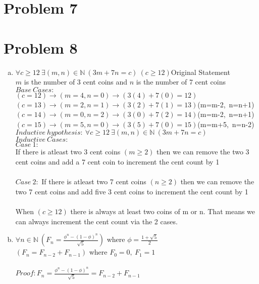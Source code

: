 \documentclass[11pt,letterpaper]{article}
\begin{document}
\section*{Problem 7}

\section*{Problem 8}
\begin{enumerate}[(a)]
\item

$\forall c\geq 12~\exists(m,n)\in\mathbb{N}~(3m + 7n = c)~(c\geq 12)$\hfill Original Statement\\
$m$ is the number of 3 cent coins and $n$ is the number of 7 cent coins\\
$Base~Cases:$\\
$(c=12)\rightarrow (m=4,n=0)\rightarrow (3(4) + 7(0) = 12)$\\
$(c=13)\rightarrow (m=2,n=1)\rightarrow (3(2) + 7(1) = 13)$\hfill (m=m-2,~n=n+1)\\
$(c=14)\rightarrow (m=0,n=2)\rightarrow (3(0) + 7(2) = 14)$\hfill (m=m-2,~n=n+1)\\
$(c=15)\rightarrow (m=5,n=0)\rightarrow (3(5) + 7(0) = 15)$\hfill (m=m+5,~n=n-2)\\
$Inductive~hypothesis:~\forall c\geq 12~\exists(m,n)\in\mathbb{N}~(3m + 7n = c)$\\
$Inductive~Cases:$\\
$Case~1:$\\
If there is atleast two 3 cent coins $(m\geq2)$ then we can remove the two 3 cent coins and add a 7 cent coin to increment the cent count by 1\\ 
\\
$Case~2:$
If there is atleast two 7 cent coins $(n\geq2)$ then we can remove the two 7 cent coins and add five 3 cent coins to increment the cent count by 1\\ 
\\
When $(c\geq 12)$ there is always at least two coins of m or n. That means we can always increment the cent count via the 2 cases.
\\
\item
$\forall n\in\mathbb{N}~(F_n = \frac{\phi^n-(1-\phi)^n}{\sqrt{5}})$ where $\phi = \frac{1+\sqrt{5}}{2}$\\
$(F_n = F_{n-2} +F_{n-1})$ where $F_0 = 0,~F_1 =1$\\
\\
$Proof: F_n = \frac{\phi^n-(1-\phi)^n}{\sqrt{5}}= F_{n-2} +F_{n-1}$\\

\end{enumerate}
\end{document}
